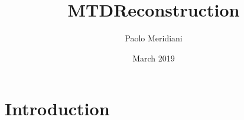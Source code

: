 \documentclass{article}
\title{MTDReconstruction}
\author{Paolo Meridiani}
\date{March 2019}
\begin{document}
\maketitle

\section{Introduction}
\end{document}
